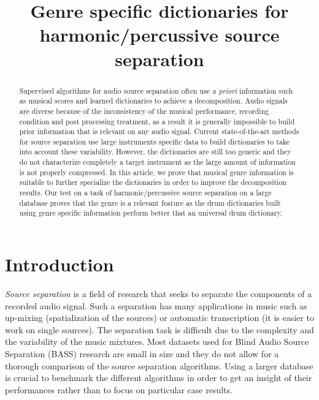 \documentclass{article}
\title{Genre specific dictionaries for harmonic/percussive source separation}
\begin{document}
%
\maketitle
%


\begin{abstract}

Supervised algorithms for audio source separation often use {\it a priori} information such as musical scores and learned dictionaries to achieve a decomposition. Audio signals are diverse because of the inconsistency of the musical performance, recording condition and post processing treatment, as a result it is generally impossible to build prior information that is relevant on any audio signal. Current state-of-the-art methods for source separation use large instruments specific data to build dictionaries to take into account these variability. However, the dictionaries are still too generic and they do not characterize completely a target instrument as the large amount of information is not properly compressed.  
In this article, we prove that musical genre information is suitable to further specialize the dictionaries in order to improve the decomposition results. Our test on a task of harmonic/percussive source separation on a large database proves that the genre is a relevant feature as the drum dictionaries built using genre specific information perform better that an universal drum dictionary.  




\end{abstract}
%
\section{Introduction}\label{sec:introduction}


\emph{Source separation} is a field of research that seeks to separate the components of a recorded audio signal. Such a separation has many applications in music such as up-mixing \cite{fitzgerald2011upmixing} (spatialization of the sources) or automatic transcription \cite{vincent2010adaptive} (it is easier to work on single sources). The separation task is difficult due to the complexity and the variability of the music mixtures. Most datasets used for Blind Audio Source Separation (BASS) research are small in size and they do not allow for a thorough comparison of the source separation algorithms. Using a larger database is crucial to benchmark the different algorithms in order to get an insight of their performances rather than to focus on particular case results.%
\end{document}
